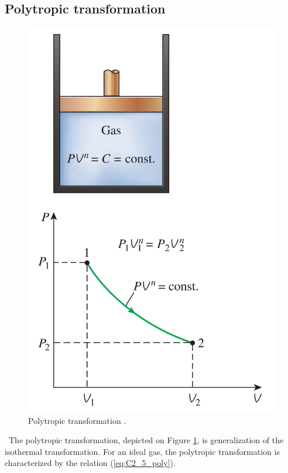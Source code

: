 \subsection{Polytropic transformation}
\begin{figure}
  \centering
  \includegraphics{poly.png}
  \caption{Polytropic transformation \cite{2015}.}
  \label{fig:C2_5_poly}
\end{figure}

\quad\ The polytropic transformation, depicted on Figure \ref{fig:C2_5_poly}, is  generalization of the isothermal transformation. For an ideal gas, the polytropic transformation is characterized by the relation (\ref{eq:C2_5_poly}).

